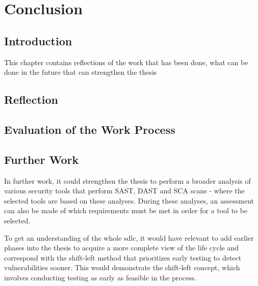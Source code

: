 \chapter{Conclusion}
\section{Introduction}
This chapter contains reflections of the work that has been done, what can be done in the future that can strengthen the thesis

\section{Reflection}


\section{Evaluation of the Work Process}



\section{Further Work}

In further work, it could strengthen the thesis to perform a broader analysis of various security tools that perform SAST, DAST and SCA scans -  where the selected tools are based on these analyses. During these analyses, an assessment can also be made of which requirements must be met in order for a tool to be selected. 

To get an understanding of the whole \acrlong{sdlc}, it would have relevant to add earlier phases into the thesis to acquire a more complete view of the life cycle and correspond with the shift-left method that prioritizes early testing to detect vulnerabilities sooner. This would demonstrate the shift-left concept, which involves conducting testing as early as feasible in the process. 




